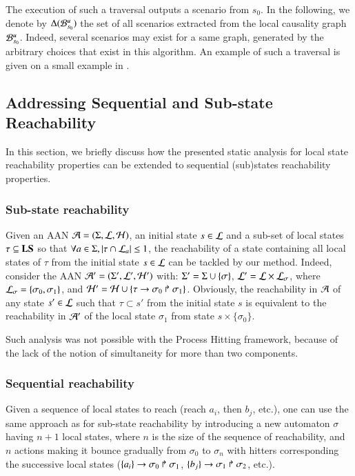 The execution of such a traversal outputs a scenario from $s_0$.
In the following, we denote by $\Delta({\mathcal{B}_{s_0}^{u}})$ the set of all scenarios extracted from the
local causality graph ${\mathcal{B}_{s_0}^{u}}$.
Indeed, several scenarios may exist for a same graph,
generated by the arbitrary choices that exist in this algorithm.
An example of such a traversal is given on a small example
in .



\subsection{Addressing Sequential and Sub-state Reachability}
\label{ssec:ordered-ua}
\label{ssec:simult-ua}

\newcommand{\total}{\tau}
\newcommand{\reach}{\sigma}

In this section, we briefly discuss how the presented static analysis for local
state reachability properties can be extended to sequential (sub)states
reachability properties.

\subsubsection*{Sub-state reachability}
Given an AAN $\mathcal{A} = (\Sigma, \mathcal{L}, \mathcal{H})$,
an initial state $s \in \mathcal{L}$ and
a sub-set of local states
$\total \subseteq \Proc$ %
so that $\forall a \in \PHs, \card{\total \cap \PHl_a} \leq 1$,
the reachability of a state containing all local states of $\total$
from the initial state $s\in\mathcal{L}$
can be tackled by our method.
Indeed,
consider the AAN
$\mathcal{A}' = (\Sigma', \mathcal{L}', \mathcal{H}')$ with:
$\PHs' = \PHs \cup \{ \reach \}$, $\PHl' = \PHl \times \PHl_\reach$,
where $\PHl_\reach = \{ \reach_0, \reach_1 \}$,
and $\PHh' = \PHh \cup \{ \PHhit{\total}{\reach_0}{\reach_1} \}$.
Obviously,
the reachability in $\mathcal{A}$
of any state $s'\in\mathcal{L}$ such that
$\total \subset s'$ from the initial state $s$
is equivalent to the reachability in $\mathcal{A}'$ of the local state
$\reach_1$ from state $s \times \{ \reach_0 \}$.

Such analysis was not possible with the Process Hitting framework,
because of the lack of the notion of simultaneity for more than two components.

\subsubsection*{Sequential reachability}
Given a sequence of local states to reach (\eg reach $a_i$, then $b_j$, etc.),
one can use the same approach as for sub-state reachability by introducing
a new automaton $\reach$ having $n+1$ local states, where $n$ is the size of the
sequence of reachability, and $n$ actions making it bounce gradually from $\reach_0$ to
$\reach_n$ with hitters corresponding the successive local states
(\eg $\PHfrappes{a_i}{\reach_0}{\reach_1}$,
$\PHfrappes{b_j}{\reach_1}{\reach_2}$, etc.).

